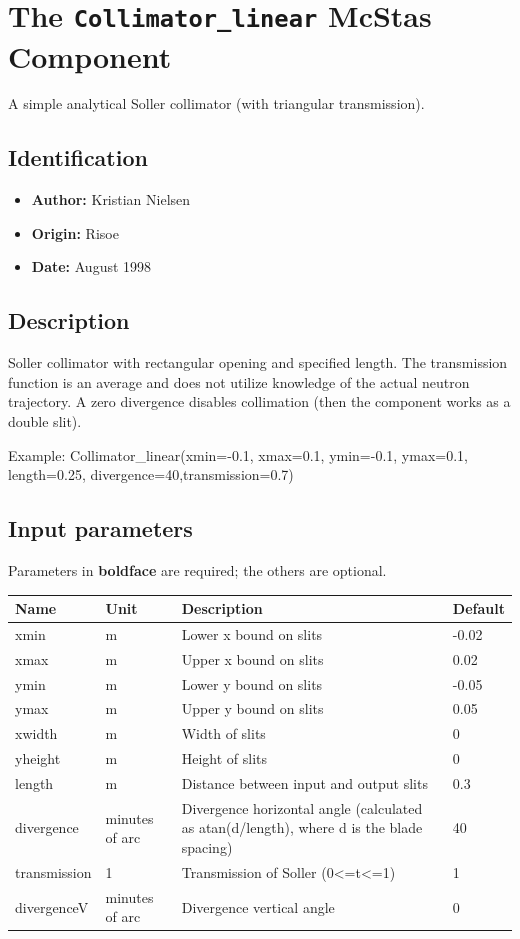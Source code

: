 \section{The \texttt{Collimator\_linear} McStas Component}
A simple analytical Soller collimator (with triangular transmission).

\subsection*{Identification}
\begin{itemize}
  \item \textbf{Author:} Kristian Nielsen
  \item \textbf{Origin:} Risoe
  \item \textbf{Date:} August 1998
\end{itemize}

\subsection*{Description}
Soller collimator with rectangular opening and specified length. The transmission function is an average and does not utilize knowledge of the actual neutron trajectory. A zero divergence disables collimation (then the component works as a double slit).

Example: Collimator\_linear(xmin=-0.1, xmax=0.1, ymin=-0.1, ymax=0.1, length=0.25, divergence=40,transmission=0.7)

\subsection*{Input parameters}
Parameters in \textbf{boldface} are required; the others are optional.

\begin{longtable}{p{}p{}p{}p{}}
\toprule
\textbf{Name} & \textbf{Unit} & \textbf{Description} & \textbf{Default} \\
\midrule
\endhead
xmin & m & Lower x bound on slits & -0.02 \\
xmax & m & Upper x bound on slits & 0.02 \\
ymin & m & Lower y bound on slits & -0.05 \\
ymax & m & Upper y bound on slits & 0.05 \\
xwidth & m & Width of slits & 0 \\
yheight & m & Height of slits & 0 \\
length & m & Distance between input and output slits & 0.3 \\
divergence & minutes of arc & Divergence horizontal angle (calculated as atan(d/length), where d is the blade spacing) & 40 \\
transmission & 1 & Transmission of Soller (0\textless{}=t\textless{}=1) & 1 \\
divergenceV & minutes of arc & Divergence vertical angle & 0 \\
\bottomrule
\end{longtable}

